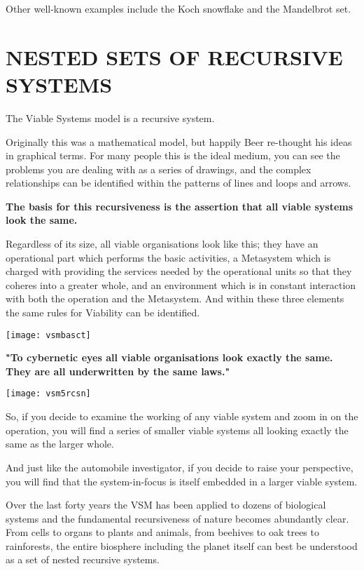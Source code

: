 Other well-known examples include the Koch snowflake and the Mandelbrot set.

\section*{NESTED SETS OF RECURSIVE SYSTEMS}
The Viable Systems model is a recursive system.

Originally this was a mathematical model, but happily Beer re-thought his ideas in graphical terms. For many people this is the ideal medium, you can see the problems you are dealing with as a series of drawings, and the complex relationships can be identified within the patterns of lines and loops and arrows.

\textbf{The basis for this recursiveness is the assertion that all viable systems look the same.}

Regardless of its size, all viable organisations look like this; they have an operational part which performs the basic activities, a Metasystem which is charged with providing the services needed by the operational units so that they coheres into a greater whole, and an environment which is in constant interaction with both the operation and the Metasystem. And within these three elements the same rules for Viability can be identified.

\begin{center}
\texttt{[image: vsmbasct]}
\end{center}

\textbf{"To cybernetic eyes all viable organisations look exactly the same.
They are all underwritten by the same laws."}

\begin{center}
\texttt{[image: vsm5rcsn]}
\end{center}

So, if you decide to examine the working of any viable system and zoom in on the operation, you will find a series of smaller viable systems all looking exactly the same as the larger whole.

And just like the automobile investigator, if you decide to raise your perspective, you will find that the system-in-focus is itself embedded in a larger viable system.

Over the last forty years the VSM has been applied to dozens of biological systems and the fundamental recursiveness of nature becomes abundantly clear. From cells to organs to plants and animals, from beehives to oak trees to rainforests, the entire biosphere including the planet itself can best be understood as a set of nested recursive systems.

